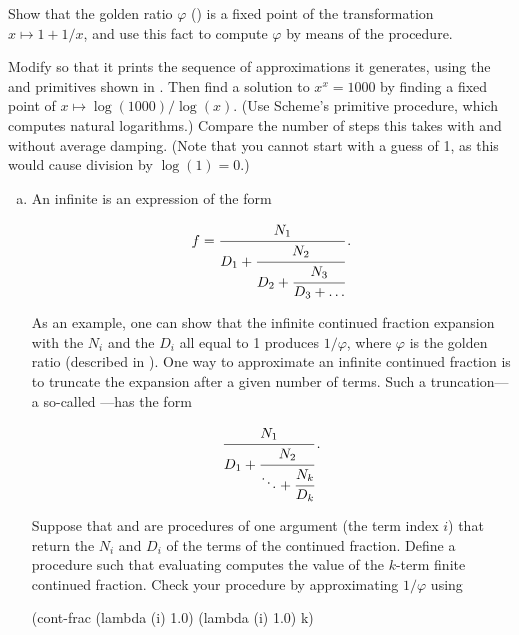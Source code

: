 \begin{exerciseGroup}
\label{Exercise 1.35}
 Show that the golden ratio
\( \varphi \) () is a fixed point of the transformation
\( x \mapsto 1 + 1 / x \), and use this fact to compute \( \varphi \) by means
of the  procedure.

\label{Exercise 1.36}
 Modify  so that
it prints the sequence of approximations it generates, using the 
and  primitives shown in .  Then find a
solution to \( x^x = 1000 \) by finding a fixed point of \( x \mapsto
\log(1000) / \log(x) \).  (Use Scheme's primitive 
procedure, which computes natural logarithms.)  Compare the number of steps
this takes with and without average damping.  (Note that you cannot start
 with a guess of 1, as this would cause division by
\( \log(1) = 0 \).)

\label{Exercise 1.37}
 \begin{enumerate}[a.]

\item
An infinite  is an expression of the form

$$ {f} = \cfrac{N_1}{D_1 + \cfrac{N_2}{D_2 + \cfrac{N_3}{D_3 + \dots}}}\,. $$

As an example, one can show that the infinite continued fraction expansion with
the \( N_i \) and the \( D_i \) all equal to 1 produces \( 1 / \varphi \), where
\( \varphi \) is the golden ratio (described in ).  One way to
approximate an infinite continued fraction is to truncate the expansion after a
given number of terms.  Such a truncation---a so-called ---has the form

$$ \cfrac{N_1}{D_1 + \cfrac{N_2}{\ddots + \cfrac{N_k}{D_k}}}\,. $$

Suppose that  and  are procedures of one argument (the term
index \( i \)) that return the \( N_i \) and \( D_i \) of the terms of the
continued fraction.  Define a procedure  such that evaluating
 computes the value of the \( k \)-term finite continued
fraction.  Check your procedure by approximating \( 1 / \varphi \) using

\begin{codeBlock}
(cont-frac (lambda (i) 1.0)
           (lambda (i) 1.0)
           k)
\end{codeBlock}


\end{enumerate}
\end{exerciseGroup}
